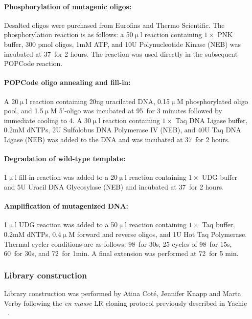 \paragraph{Phosphorylation of mutagenic oligos:}  Desalted oligos were purchased from Eurofins and Thermo Scientific. The phosphorylation reaction is as follows: a 50$\upmu$l reaction containing $1\times$ PNK buffer, 300 pmol oligos, 1mM ATP, and 10U Polynucleotide Kinase (NEB) was incubated at 37\celsius\ for 2 hours.  The reaction was used directly in the subsequent POPCode reaction. 

\paragraph{POPCode oligo annealing and fill-in:} A 20$\upmu$l reaction containing 20ng uracilated DNA, 0.15$\upmu$M phosphorylated oligo pool, and 1.5$\upmu$M 5'-oligo was incubated at 95\celsius\ for 3 minutes followed by immediate cooling to 4\celsius.  A 30$\upmu$l reaction containing $1\times$ Taq DNA Ligase buffer, 0.2mM dNTPs, 2U Sulfolobus DNA Polymerase IV (NEB), and 40U Taq DNA Ligase (NEB) was added to the DNA and was incubated at 37\celsius\ for 2 hours. 

\paragraph{Degradation of wild-type template:} 1$\upmu$l fill-in reaction was added to a 20$\upmu$l reaction containing $1\times$ UDG buffer and 5U Uracil DNA Glycosylase (NEB) and incubated at 37\celsius\ for 2 hours.

\paragraph{Amplification of mutagenized DNA:} 1$\upmu$l UDG reaction was added to a 50$\upmu$l reaction containing $1\times$ Taq buffer, 0.2mM dNTPs, 0.4$\upmu$M forward and reverse oligos, and 1U Hot Taq Polymerase.  Thermal cycler conditions are as follows: 98\celsius\ for 30s, 25 cycles of 98\celsius\ for 15s, 60\celsius\ for 30s, and 72\celsius\ for 1min. A final extension was performed at 72\celsius\ for 5 min.

\subsubsection{Library construction}
Library construction was performed by Atina Cot\'e, Jennifer Knapp and Marta Verby following the \textit{en masse} LR cloning protocol previously described in Yachie \etal\ \cite{yachie_pooledmatrix_2016}. 

